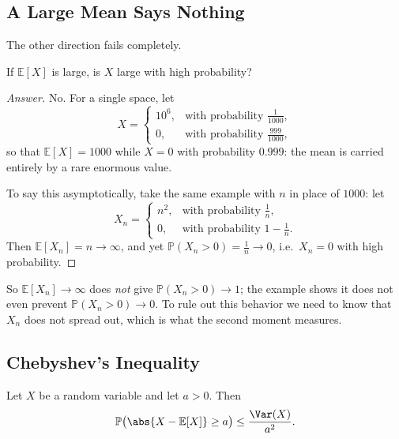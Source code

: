 \subsection{A Large Mean Says Nothing}

The other direction fails completely.

\begin{question}\label{q:large-mean}
    If \(\mathbb{E}[X]\) is large, is \(X\) large with high probability?
\end{question}

\begin{proof}[Answer]
    No. For a single space, let
    \[
        X = \begin{cases}
            10^{6}, & \text{with probability } \frac{1}{1000}, \\
            0, & \text{with probability } \frac{999}{1000},
        \end{cases}
    \]
    so that \(\mathbb{E}[X] = 1000\) while \(X = 0\) with probability \(0.999\): the mean is carried entirely by a rare enormous value.

    To say this asymptotically, take the same example with \(n\) in place of \(1000\): let
    \[
        X_n = \begin{cases}
            n^{2}, & \text{with probability } \frac{1}{n}, \\
            0, & \text{with probability } 1 - \frac{1}{n}.
        \end{cases}
    \]
    Then \(\mathbb{E}[X_n] = n \to \infty\), and yet \(\mathbb{P}(X_n > 0) = \frac{1}{n} \to 0\), i.e.\ \(X_n = 0\) with high probability.
\end{proof}

So \(\mathbb{E}[X_n] \to \infty\) does \emph{not} give \(\mathbb{P}(X_n > 0) \to 1\); the example shows it does not even prevent \(\mathbb{P}(X_n > 0) \to 0\). To rule out this behavior we need to know that \(X_n\) does not spread out, which is what the second moment measures.

\subsection{Chebyshev's Inequality}

\begin{theorem}\label{thm:chebyshev}
    Let \(X\) be a random variable and let \(a > 0\). Then
    \[
        \mathbb{P}\bigl( \abs{X - \mathbb{E}[X]} \ge a \bigr) \le \frac{\Var(X)}{a^{2}}.
    \]
\end{theorem}

